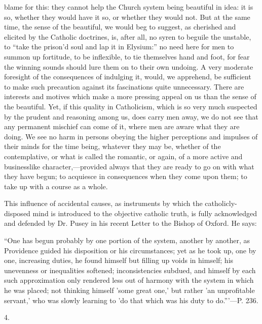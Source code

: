 blame for this: they cannot help the Church system being
beautiful in idea: it is so, whether they would have it so, or whether
they would not. But at the same time, the sense of the beautiful, we
would beg to suggest, as cherished and elicited by the Catholic
doctrines, is, after all, no syren to beguile the unstable, to ``take
the prison'd soul and lap it in Elysium:'' no need here for men to
summon up fortitude, to be inflexible, to tie themselves hand and
foot, for fear the winning sounds should lure them on to their own
undoing. A very moderate foresight of the consequences of indulging
it, would, we apprehend, be sufficient to make such precaution against
its fascinations quite unnecessary. There are interests and motives
which make a more pressing appeal on us than the sense of the
beautiful. Yet, if this quality in Catholicism, which is so very much
suspected by the prudent and reasoning among us, does carry men away,
we do not see that any permanent mischief can come of it, where men
are aware what they are doing. We see no harm in persons obeying the
higher perceptions and impulses of their minds for the time being,
whatever they may be, whether of the contemplative, or what is called
the romantic, or again, of a more active and businesslike
character,—provided always that they are ready to go on with what
they have begun; to acquiesce in consequences when they come upon
them; to take up with a course as a whole.

This influence of accidental causes, as
instruments by which the catholicly-disposed mind is introduced to the
objective catholic truth, is fully acknowledged and defended by Dr.
Pusey in his recent Letter to the Bishop of Oxford. He says:

``One has
begun probably by one portion of the system, another by another, as
Providence guided his disposition or his circumstances; yet
as he took up, one by one, increasing duties, he found himself but
filling up voids in himself; his unevenness or inequalities softened;
inconsistencies subdued, and himself by each such approximation only
rendered less out of harmony with the system in which he was placed;
not thinking himself 'some great one,' but rather 'an unprofitable
servant,' who was slowly learning to 'do that which was his duty to
do.'''—P. 236.

4.

